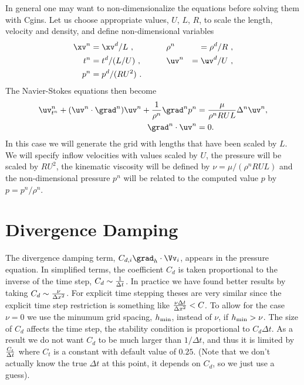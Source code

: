 \documentclass[12pt]{article}
\begin{document}
\newcommand{\tnd}{t^n}
\newcommand{\xvt}{\xv^n}
\newcommand{\uvt}{\uv^n}
\newcommand{\pt}{p^n}
\newcommand{\rhot}{\rho^n}
\newcommand{\Deltat}{\Delta^n}
\newcommand{\gradt}{\grad^n}
In general one may want to non-dimensionalize the equations before solving them
with Cgins. 
Let us choose appropriate values, $U$, $L$, $R$,
to scale the length, velocity and density,
and define non-dimensional variables
\begin{alignat}{3}
   \xvt & = \xvp/L  ~, &\qquad&  \rhot &= \rhop/R  ~,\\
   \tnd & = \tp/(L/U) ~, &&  \uvt &= {\uvp/U} ~, \\
   \pt &= \pp/(R U^2)~.
\end{alignat}
The Navier-Stokes equations then become
\begin{align}
   \uvt_{\tnd} + (\uvt\cdot\gradt)\uvt + {1\over\rhot} \gradt \pt &= \frac{\mu}{\rhot R U L} \Deltat \uvt, 
                          \label{eq:uvt}\\
   \gradt\cdot\uvt &= 0.
\end{align}
In this case we will generate the grid with lengths that have been scaled by $L$. We will specify inflow
velocities with values scaled by $U$, the pressure will be scaled by $R U^2$,
the kinematic viscosity will be defined by
$\nu=\mu/(\rhot R U L)$ and the non-dimensional pressure $\pt$ will be related to
the computed value $p$ by $p=\pt/\rhot$.

\clearpage
\section{Divergence Damping} 

The divergence damping term, $C_{d,i} \grad_h\cdot\Vv_i$, appears in the pressure equation.
In simplified terms, the coefficient $C_d$ is taken proportional to the inverse
of the time step, $C_d \sim {1\over \Delta t}$. In practice we have found better results
by taking $C_d \sim {\nu \over \Delta x ^2}$. For explicit time stepping theses are
very similar since the explicit time step restriction is something like ${\nu \Delta t \over\Delta x ^2 }<C$.
To allow for the case $\nu=0$ we use the minumum grid spacing, $h_{\rm min}$,  instead of $\nu$, if
$h_{\rm min} > \nu$.
The size of $C_d$ affects the time step, the stability condition is proportional to $C_d \Delta t$.
As a result we do not want $C_d$ to be much larger than $1/\Delta t$,
and thus it is limited by ${C_t \over \Delta t}$ where $C_t$ is a constant with default value of $0.25$. 
(Note that we don't actually know the true $\Delta t$ at this point, it depends on $C_d$, so we just use a guess).
\end{document}

